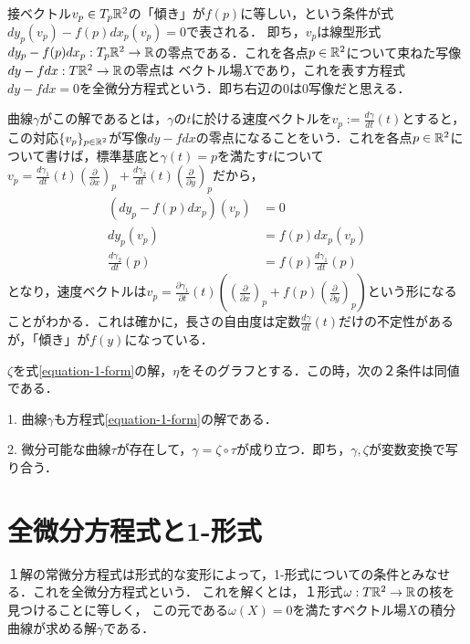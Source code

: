 \documentclass[uplatex,dvipdfmx]{jsreport}
\begin{document}
\begin{example}[全微分方程式の意味]
    接ベクトル$v_p\in T_p\mathbb{R}^2$の「傾き」が$f(p)$に等しい，という条件が式$dy_p(v_p)-f(p)dx_p(v_p)=0$で表される．
    即ち，$v_p$は線型形式$dy_p-f(p)dx_p:T_p\mathbb{R}^2\to\mathbb{R}$の零点である．これを各点$p\in\mathbb{R}^2$について束ねた写像$dy-fdx:T\mathbb{R}^2\to\mathbb{R}$の零点は
    ベクトル場$X$であり，これを表す方程式$dy-fdx=0$を全微分方程式という．即ち右辺の$0$は$0$写像だと思える．

    曲線$\gamma$がこの解であるとは，$\gamma$の$t$に於ける速度ベクトルを$v_p:=\frac{d\gamma}{dt}(t)$とすると，
    この対応$\{v_p\}_{p\in\mathbb{R}^2}$が写像$dy-fdx$の零点になることをいう．これを各点$p\in\mathbb{R}^2$について書けば，標準基底と$\gamma(t)=p$を満たす$t$について$v_p=\frac{d\gamma_1}{d t}(t)\left(\frac{\partial}{\partial x}\right)_p+\frac{d\gamma_2}{d t}(t)\left(\frac{\partial}{\partial y}\right)_p$だから，
    \begin{align*}
        (dy_p-f(p)dx_p)(v_p)&=0\\
        dy_p(v_p)&=f(p)dx_p(v_p)\\
        \frac{d\gamma_2}{dt}(p)&=f(p)\frac{d\gamma_1}{dt}(p)
    \end{align*}
    となり，速度ベクトルは$v_p=\frac{\partial\gamma_1}{\partial t}(t)\left( \left(\frac{\partial}{\partial x}\right)_p + f(p)\left(\frac{\partial}{\partial y}\right)_p\right)$という形になることがわかる．これは確かに，長さの自由度は定数$\frac{d\gamma}{dt}(t)$だけの不定性があるが，「傾き」が$f(y)$になっている．

\end{example}
\begin{theorem}[変数変換に対する不変性]\label{thm-solution-change-of-variables}
    $\zeta$を式\ref{equation-1-form}の解，$\eta$をそのグラフとする．この時，次の２条件は同値である．

    1. 曲線$\gamma$も方程式\ref{equation-1-form}の解である．

    2. 微分可能な曲線$\tau$が存在して，$\gamma=\zeta\circ\tau$が成り立つ．即ち，$\gamma,\zeta$が変数変換で写り合う．
\end{theorem}

\section{全微分方程式と1-形式}
１解の常微分方程式は形式的な変形によって，1-形式についての条件とみなせる．これを全微分方程式という．
これを解くとは，１形式$\omega:T\mathbb{R}^2\to\mathbb{R}$の核を見つけることに等しく，
この元である$\omega(X)=0$を満たすベクトル場$X$の積分曲線が求める解$\gamma$である．
\end{document}
